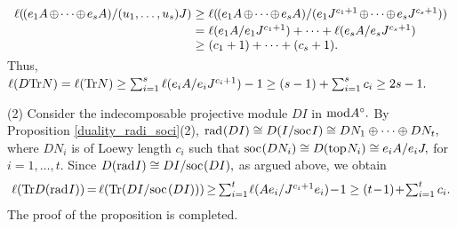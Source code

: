 \documentclass[10pt]{amsart}
\theoremstyle{definition}
\newcommand{\mmod}{{\rm mod}}
\newcommand{\rad}{{\rm rad}\hspace{.5pt}}
\newcommand{\soc}{{\rm soc}\hspace{.5pt}}
\newcommand{\ntop}{{\rm top}\hspace{.5pt}}
\newcommand{\hp}{\hspace{.5pt}}
\begin{document}
$$\begin{array}{rcl}
\ell(\hspace{-1pt} (e_1A \hspace{-1pt} \oplus \hspace{-1pt}  \cdots \hspace{-1pt} \oplus \hspace{-1pt} e_sA)/(u_1, \ldots, u_s)J) \hspace{-7pt}
&\ge & \hspace{-7pt}
\ell(\hspace{-1pt} (e_1A\hspace{-1pt} \oplus \hspace{-1pt} \cdots \hspace{-1pt} \oplus \hspace{-1pt}  e_sA)/(e_1J^{c_1+1}\hspace{-1pt} \oplus \hspace{-1pt} \cdots \hspace{-1pt} \oplus \hspace{-1pt} e_s J^{c_s+1})) \vspace{2pt} \\
&=& \hspace{-7pt} \ell(e_1A/e_1J^{c_1+1})+\cdots + \ell(e_sA/e_sJ^{c_s+1})  \\
&\ge & \hspace{-7pt} (c_1+1)+\cdots +(c_s+1). \vspace{-4pt} 
\end{array}$$
Thus, \vspace{1pt} $\ell(D{\rm Tr}N)=\ell({\rm Tr}N)\ge \textstyle \sum_{i=1}^s \ell(e_iA/e_iJ^{c_i+1})-1\ge (s-1)+ \sum_{i=1}^s c_i\ge 2s-1.$ 

\vspace{1pt}

(2) Consider the indecomposable projective module $DI$ in $\mmod A^\circ.$
By Proposition \ref{duality_radi_soci}(2), \vspace{.5pt} $\rad(DI)\cong D(I/\soc I)\cong DN_1 \oplus \cdots \oplus DN_t,$ where $DN_i$ is of Loewy length $c_i$ such that $\soc(D N_i)\cong D(\ntop N_i)\cong e_iA/e_iJ,$ for $i=1, \ldots, t$. Since $D(\rad I)\cong DI/\soc(DI),$ as argued above, we obtain \vspace{-2pt}
$$\ell({\rm Tr}D(\rad I)) \hspace{-1pt} = \hspace{-1pt} \ell({\rm Tr}(DI/\soc\hp (DI))) \hspace{-1pt}\ge \hspace{-1pt} \textstyle\sum_{i=1}^t \hspace{-1pt} \ell(Ae_i/J^{c_i+1} e_i) \!-\! 1 \ge (t\!-\!1) \!+\!\sum_{i=1}^tc_i.\vspace{-2pt}$$
The proof of the proposition is completed.
\end{document}
